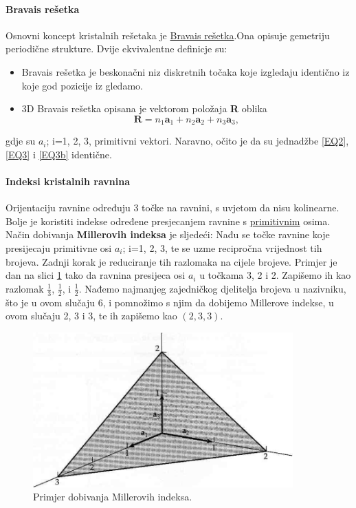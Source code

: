 \documentclass{article}
\numberwithin{equation}{section}
\begin{document}
\paragraph{Bravais rešetka}
Osnovni koncept kristalnih rešetaka je \underline{Bravais rešetka}.Ona opisuje gemetriju periodične strukture.  Dvije ekvivalentne definicje su: 
\begin{itemize}
    \item Bravais rešetka je beskonačni niz diskretnih točaka koje izgledaju identično iz koje god pozicije iz gledamo.
    \item 3D Bravais rešetka opisana je vektorom položaja \textbf{R} oblika 
    \begin{equation}
        \mathbf{R}= n_1\mathbf{a}_1 + n_2\mathbf{a}_2 + n_3\mathbf{a}_3,
        \label{EQ3b}
    \end{equation}
\end{itemize}
gdje su $a_i$; i=1, 2, 3, primitivni vektori. Naravno, očito je da su jednadžbe \ref{EQ2}, \ref{EQ3} i \ref{EQ3b} identične.
\paragraph{Indeksi kristalnih ravnina}
Orijentaciju ravnine određuju 3 točke na ravnini, s uvjetom da nisu kolinearne. Bolje je koristiti indekse određene presjecanjem ravnine s \underline{primitivnim} osima. Način dobivanja \textbf{Millerovih indeksa} je sljedeći: Nađu se točke ravnine koje presijecaju primitivne osi $a_i$; i=1, 2, 3, te se uzme recipročna vrijednost tih brojeva. Zadnji korak je reduciranje tih razlomaka na cijele brojeve.  Primjer je dan na slici \ref{fig:S9} tako da ravnina presijeca osi $a_i$ u točkama 3, 2 i 2. Zapišemo ih kao razlomak $\frac{1}{3}$,  $\frac{1}{2}$, i $\frac{1}{2}$. Nađemo najmanjeg zajedničkog djelitelja brojeva u nazivniku, što je u ovom slučaju 6, i pomnožimo s njim da dobijemo Millerove indekse, u ovom slučaju 2, 3 i 3, te ih zapišemo kao $\left( 2, 3, 3\right)$.
\begin{figure}[h!]
    \centering
    \includegraphics[width=10cm]{Slika_8.PNG}
    \caption{Primjer dobivanja Millerovih indeksa.}
    \label{fig:S9}
\end{figure}
\end{document}
